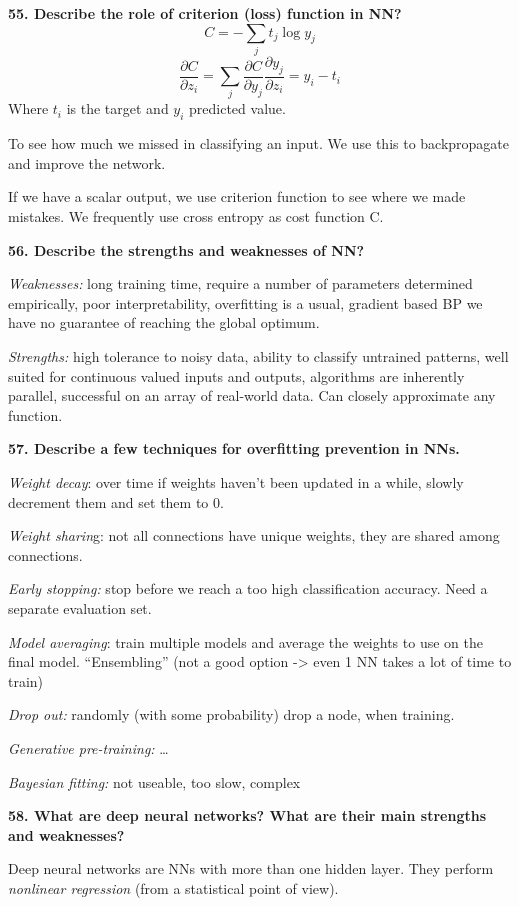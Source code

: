\textbf{55. Describe the role of criterion (loss) function in
NN?}
\[C = -\sum_j t_j \log y_j \]
\[ \frac{\partial C}{\partial z_i} = \sum_j\frac{\partial C}{\partial y_j} \frac{\partial y_j}{\partial z_i} = y_i - t_i \]
Where $t_i$ is the target and $y_i$ predicted value.

To see how much we missed in classifying an input. We use this to
backpropagate and improve the network.

If we have a scalar output, we use criterion function to see where we
made mistakes. We frequently use cross entropy as cost function C.

\textbf{56. Describe the strengths and weaknesses of NN?}

\textit{Weaknesses:} long training time, require a number of
parameters determined empirically, poor interpretability, overfitting is
a usual, gradient based BP we have no guarantee of reaching the global
optimum.

\textit{Strengths:} high tolerance to noisy data, ability to classify
untrained patterns, well suited for continuous valued inputs and
outputs, algorithms are inherently parallel, successful on an array of
real-world data. Can closely approximate any function.

\textbf{57. Describe a few techniques for overfitting prevention in
NNs.}

\textit{Weight decay}: over time if weights haven't been updated in a
while, slowly decrement them and set them to 0.

\textit{Weight sharin}g: not all connections have unique weights,
they are shared among connections.

\textit{Early stopping:} stop before we reach a too high
classification accuracy. Need a separate evaluation set.

\textit{Model averaging}: train multiple models and average the
weights to use on the final model. ``Ensembling'' (not a good option
-\textgreater{} even 1 NN takes a lot of time to train)

\textit{Drop out:} randomly (with some probability) drop a node, when
training.

\textit{Generative pre-training:} \ldots{}

\textit{Bayesian fitting:} not useable, too slow, complex

\textbf{58. What are deep neural networks? What are their main strengths
and weaknesses?}

Deep neural networks are NNs with more than one hidden layer. They
perform \emph{nonlinear regression} (from a statistical point of view).

